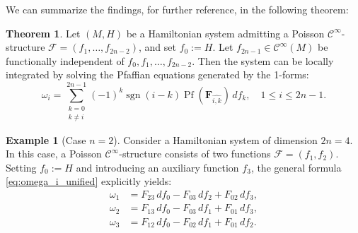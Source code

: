 \documentclass{article}
\theoremstyle{remark}
\theoremstyle{definition}
\newtheorem{theorem}{Theorem}[section]
\newtheorem{example}{Example}[section]
\newcommand{\cinf}{$\mathcal{C}^{\infty}$}
\begin{document}
We can summarize the findings, for further reference, in the following theorem:
\begin{theorem}\label{thm:pfaffinaformula}
Let $(M,H)$ be a Hamiltonian system admitting a Poisson \cinf-structure $\mathcal{F} = (f_1, \ldots, f_{2n-2})$, and set $f_0:=H$. Let $f_{2n-1}\in \mathcal{C}^\infty(M)$ be functionally independent of $f_0,f_1,\dots,f_{2n-2}$. Then the system can be locally integrated by solving the Pfaffian equations generated by the 1-forms:
\begin{equation}\label{eq:omega_i_unified}
    \omega_i = \sum_{\substack{k=0 \\ k \neq i}}^{2n-1} (-1)^{k} \operatorname{sgn}(i-k) \operatorname{Pf}(\mathbf{F}_{\widehat{i,k}}) \, df_k, \quad 1 \leq i \leq 2n-1.
\end{equation}
\end{theorem}

\begin{example}[Case $n=2$]\label{casen2}
    Consider a Hamiltonian system of dimension $2n=4$. In this case, a Poisson \cinf-structure consists of two functions $\mathcal{F}=(f_1,f_2)$. Setting $f_0:=H$ and introducing an auxiliary function $f_3$, the general formula \eqref{eq:omega_i_unified} explicitly yields:
\begin{align*}
\omega_1 &= F_{23} \, df_0 - F_{03} \, df_2 + F_{02} \, df_3, \\
\omega_2 &= F_{13} \, df_0 - F_{03} \, df_1 + F_{01} \, df_3, \\
\omega_3 &= F_{12} \, df_0 - F_{02} \, df_1 + F_{01} \, df_2.
\end{align*}
\end{example}


\end{document}
